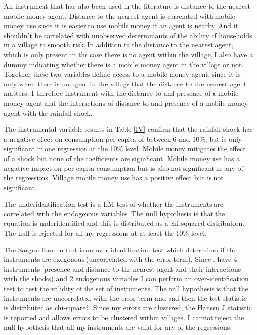 An instrument that has also been used in the literature is distance to the nearest mobile money agent. Distance to the nearest agent is correlated with mobile money use since it is easier to use mobile money if an agent is nearby. And it shouldn't be correlated with unobserved determinants of the ability of households in a village to smooth risk. In addition to the distance to the nearest agent, which is only present in the case there is no agent within the village, I also have a dummy indicating whether there is a mobile money agent in the village or not. Together these two variables define access to a mobile money agent, since it is only when there is no agent in the village that the distance to the nearest agent matters.   I therefore instrument with the distance to and presence of a mobile money agent and the interactions of distance to and presence of a mobile money agent with the rainfall shock. 



The instrumental variable results in Table \ref{IV} confirm that the rainfall shock has a  negative effect on consumption per capita of between 6 and 10\%, but is only significant in one regression at the 10\% level. Mobile money mitigates the effect of a shock but none of the coefficients are significant. Mobile money use has a negative impact on per capita consumption  but is also not significant in any of the regressions. Village mobile money use has a positive effect but is not significant. 


The underidentification test is a LM test of whether the instruments are correlated with the endogenous variables. The null hypothesis is that the equation is underidentified and this is distributed as a chi-squared distribution. The null is rejected for all my regressions at at least the 10\% level. 

The Sargan-Hansen test is an over-identification test which determines if the instruments are exogenous (uncorrelated with the error term). Since I have 4 instruments (presence and distance to the nearest agent and their interactions with the shocks) and 2 endogenous variables I can perform an over-identification test to test the validity of the set of instruments. The null hypothesis is that the instruments are uncorrelated with the error term and and then the test statistic is distributed as chi-squared. Since my errors are clustered, the Hansen J statistic is reported and allows errors to be clustered within villages. I cannot reject the null hypothesis that all my instruments are valid for any of the regressions. 

